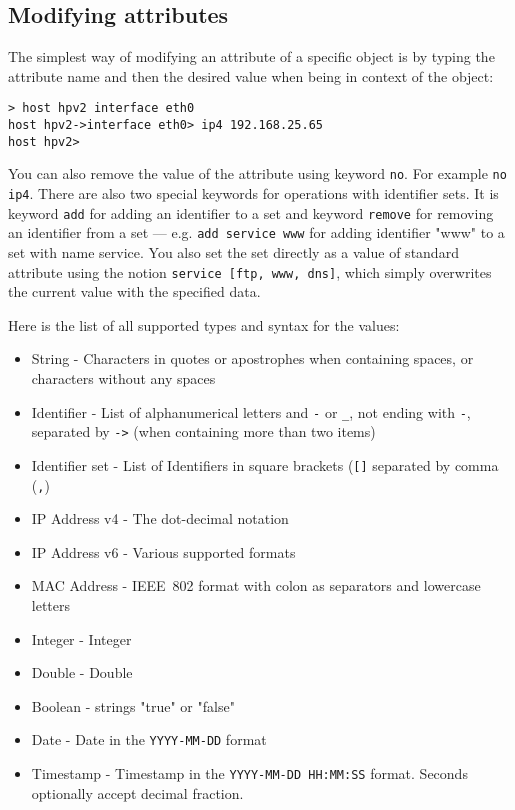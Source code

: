 \documentclass[deska]{subfiles}
\begin{document}
\subsection{Modifying attributes}

The simplest way of modifying an attribute of a specific object is by typing the attribute name and then the desired value
when being in context of the object:

\begin{verbatim}
> host hpv2 interface eth0
host hpv2->interface eth0> ip4 192.168.25.65
host hpv2>
\end{verbatim}

You can also remove the value of the attribute using keyword {\tt no}. For example {\tt no ip4}. There are also two special
keywords for operations with identifier sets. It is keyword {\tt add} for adding an identifier to a set and keyword
{\tt remove} for removing an identifier from a set --- e.g. {\tt add service www} for adding identifier "www" to a set
with name service. You also set the set directly as a value of standard attribute using the notion {\tt service [ftp, www,
dns]}, which simply overwrites the current value with the specified data.

Here is the list of all supported types and syntax for the values:

\begin{itemize}
    \item{String} - Characters in quotes or apostrophes when containing spaces, or characters without any spaces
    \item{Identifier} - List of alphanumerical letters and {\tt -} or {\tt \_}, not ending with {\tt -}, separated by
        {\tt ->} (when containing more than two items)
    \item{Identifier set} - List of Identifiers in square brackets ({\tt []} separated by comma ({\tt ,})
    \item{IP Address v4} - The dot-decimal notation~\cite{ipv4-dot-decimal}
    \item{IP Address v6} - Various supported formats~\cite{rfc5952}
    \item{MAC Address} - IEEE~802 format with colon as separators and lowercase letters
    \item{Integer} - Integer
    \item{Double} - Double
    \item{Boolean} - strings "true" or "false"
    \item{Date} - Date in the {\tt YYYY-MM-DD} format
    \item{Timestamp} - Timestamp in the {\tt YYYY-MM-DD HH:MM:SS} format.  Seconds optionally accept decimal fraction.
\end{itemize}
\end{document}
